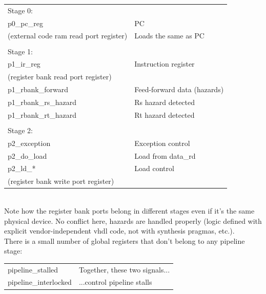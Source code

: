     \begin{tabular}{ l l }
    Stage 0:                                & \\
    p0\_pc\_reg                             & PC \\
    (external code ram read port register)  & Loads the same as PC \\
                                            & \\
    Stage 1:                                & \\
    p1\_ir\_reg                             & Instruction register \\
    (register bank read port register)      &  \\
    p1\_rbank\_forward                      & Feed-forward data (hazards) \\
    p1\_rbank\_rs\_hazard                   & Rs hazard detected \\
    p1\_rbank\_rt\_hazard                   & Rt hazard detected \\
                                            & \\
    Stage 2:                                & \\
    p2\_exception                           & Exception control \\
    p2\_do\_load                            & Load from data\_rd \\
    p2\_ld\_*                               & Load control\\
    (register bank write port register)     & \\
    \end{tabular}\\  
    
    Note how the register bank ports belong in different stages even if it's
    the same physical device. No conflict here, hazards are handled properly
    (logic defined with explicit vendor-independent vhdl code, not with 
    synthesis pragmas, etc.).\\

    There is a small number of global registers that don't belong to any 
    pipeline stage:\\
    
    \begin{tabular}{ p{4cm} l }
    pipeline\_stalled                        & Together, these two signals...\\
    pipeline\_interlocked                    & ...control pipeline stalls
    \end{tabular}\\
    

